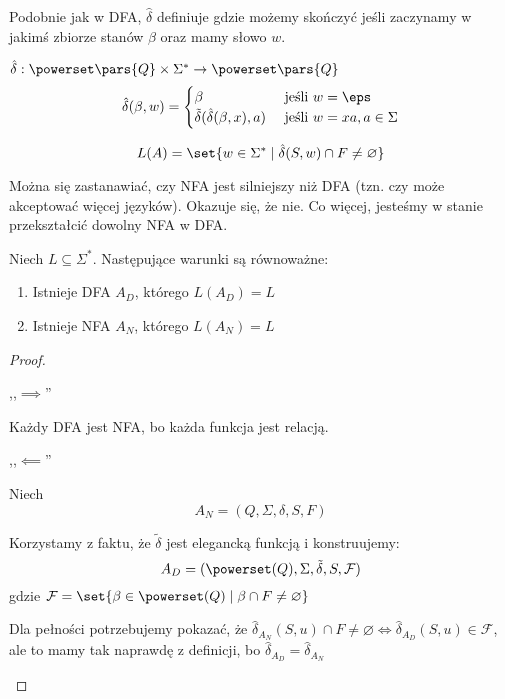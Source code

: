 Podobnie jak w DFA, \( \hat \delta \) definiuje gdzie możemy skończyć jeśli zaczynamy w jakimś zbiorze stanów \( \beta \) oraz mamy słowo \( w \).
\begin{definition}
    \( \hat \delta : \powerset\pars{Q} \times \Sigma^* \rightarrow \powerset\pars{Q} \)
    \[
        \hat \delta(\beta, w) = \begin{cases}
        \beta & \text{ jeśli } w = \eps \\
        \tilde \delta(\hat \delta(\beta, x), a) & \text{ jeśli } w = xa, a \in \Sigma \\
        \end{cases}
    \]
\end{definition}

\begin{definition}
    \[ 
        L(A) = \set{w \in \Sigma^* \mid \hat \delta(S, w) \cap F \neq \varnothing}
    \]
\end{definition}

Można się zastanawiać, czy NFA jest silniejszy niż DFA (tzn. czy może akceptować więcej języków).
Okazuje się, że nie. Co więcej, jesteśmy w stanie przekształcić dowolny NFA w DFA.
\begin{theorem}
    Niech \( L \subseteq \Sigma^* \).
    Następujące warunki są równoważne:
    \begin{enumerate}
            \item Istnieje DFA \( A_D \), którego \( L(A_D) = L \)
        \item Istnieje NFA \( A_N \), którego \( L(A_N) = L \) 
    \end{enumerate}
\end{theorem}
\begin{proof}
    \begin{description}
        \item ,,\( \implies \)''
        
            Każdy DFA jest NFA, bo każda funkcja jest relacją.
            
        \item ,,\( \impliedby \)''
        
        Niech 
        \[ A_N = (Q, \Sigma, \delta, S, F) \]
        
        Korzystamy z faktu, że \( \tilde \delta \) jest elegancką funkcją i konstruujemy:
        \[ A_D = (\powerset(Q), \Sigma, \tilde \delta, S, \mathcal{F}) \]
        gdzie \( \mathcal{F} = \set{\beta \in \powerset(Q) \mid \beta \cap F \neq \varnothing} \)
        
        Dla pełności potrzebujemy pokazać, że \( \hat \delta_{A_N}(S, u) \cap F \neq \varnothing \iff \hat \delta_{A_D}(S, u) \in \mathcal{F} \),
        ale to mamy tak naprawdę z definicji, bo \( \hat \delta_{A_D} = \hat \delta_{A_N} \)
    \end{description}
\end{proof}

